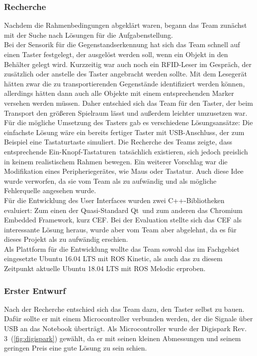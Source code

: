 \documentclass[a4paper,12pt,headsepline]{scrartcl}
\begin{document}
	\subsubsection{Recherche}
		Nachdem die Rahmenbedingungen abgeklärt waren, begann das Team zunächst mit der Suche nach Lösungen für die Aufgabenstellung.\\
		Bei der Sensorik für die Gegenstandserkennung hat sich das Team schnell auf einen Taster festgelegt, der ausgelöst werden soll, wenn ein Objekt in den Behälter gelegt wird. Kurzzeitig war auch noch ein RFID-Leser im Gespräch, der zusätzlich oder anstelle des Taster angebracht werden sollte. Mit dem Lesegerät hätten zwar die zu transportierenden Gegenstände identifiziert werden können, allerdings hätten dann auch alle Objekte mit einem entsprechenden Marker versehen werden müssen. Daher entschied sich das Team für den Taster, der beim Transport den größeren Spielraum lässt und außerdem leichter umzusetzen war. \\
		Für die mögliche Umsetzung des Tasters gab es verschiedene Lösungsansätze: Die einfachste Lösung wäre ein bereits fertiger Taster mit USB-Anschluss, der zum Beispiel eine Tastaturtaste simuliert. Die Recherche des Teams zeigte, dass entsprechende \glqq Ein-Knopf-Tastaturen\grqq\ tatsächlich existieren, sich jedoch preislich in keinem realistischem Rahmen bewegen. Ein weiterer Vorschlag war die Modifikation eines Peripheriegerätes, wie Maus oder Tastatur. Auch diese Idee wurde verworfen, da sie vom Team als zu aufwändig und als mögliche Fehlerquelle angesehen wurde. \\
		Für die Entwicklung des User Interfaces wurden zwei C++-Bibliotheken evaluiert: Zum einen der Quasi-Standard \glqq Qt\grqq\ und zum anderen das \glqq Chromium Embedded Framework\grqq , kurz CEF. Bei der Evaluation stellte sich das CEF als interessante Lösung heraus, wurde aber vom Team aber abgelehnt, da es für dieses Projekt als zu aufwändig erschien. \\
		Als Plattform für die Entwicklung wollte das Team sowohl das im Fachgebiet eingesetzte Ubuntu 16.04 LTS mit ROS Kinetic, als auch das zu diesem Zeitpunkt aktuelle Ubuntu 18.04 LTS mit ROS Melodic erproben.

	\subsubsection{Erster Entwurf}	
		Nach der Recherche entschied sich das Team dazu, den Taster selbst zu bauen. Dafür sollte er mit einem Microcontroller verbunden werden, der die Signale über USB an das Notebook überträgt. Als Microcontroller wurde der \glqq Digispark Rev. 3\grqq\ (\cref{fig:digispark}) gewählt, da er mit seinen kleinen Abmessungen und seinem geringen Preis eine gute Lösung zu sein schien. 
\end{document}
